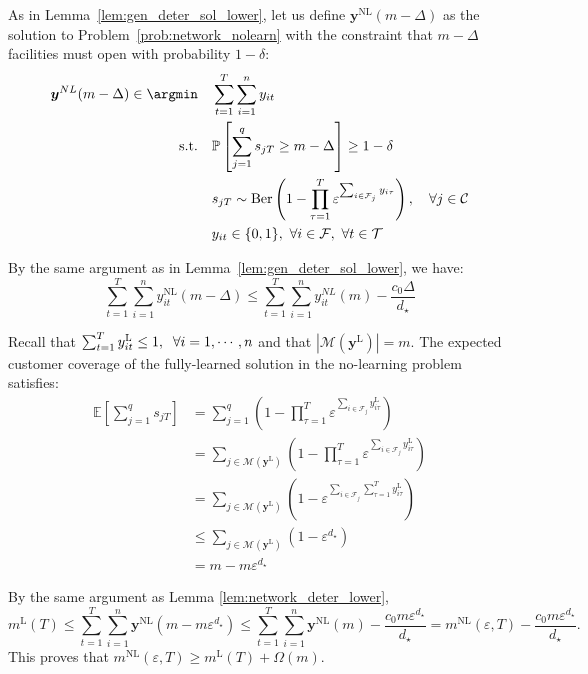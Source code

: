 \documentclass[nonblindrev]{informs3noheader}
\DeclareMathOperator\Ber{Ber}
\def\E{\mathbb{E}}
\def\P{\mathbb{P}}
\def\calC{\mathcal{C}}
\def\calF{\mathcal{F}}
\def\calM{\mathcal{M}}
\def\calT{\mathcal{T}}
\def\by{\boldsymbol{y}}
\def\st{\text{s.t.}}
\begin{document}
As in Lemma~\ref{lem:gen_deter_sol_lower}, let us define $\by^{\mathrm{NL}}(m-\Delta)$ as the solution to Problem~\eqref{prob:network_nolearn} with the constraint that $m-\Delta$ facilities must open with probability $1-\delta$:
\begin{align*}
    \by^{NL}(m-\Delta)\in\argmin \quad & \sum_{t=1}^T \sum_{i=1}^n y_{it} \\
    \st\quad&\P\left[\sum_{j=1}^q s_{jT} \geq m-\Delta\right] \geq 1-\delta\\
    \quad& s_{jT}\sim \Ber\left(1-\prod_{\tau=1}^T \varepsilon^{\sum_{i \in \calF_j} y_{i\tau}}\right),\quad \forall j\in\calC\\
    \quad& y_{it}\in\{0,1\},\ \forall i\in \calF, \ \forall t\in\calT
\end{align*}

By the same argument as in Lemma~\ref{lem:gen_deter_sol_lower}, we have:
\[\sum_{t=1}^T \sum_{i=1}^n y_{it}^{\mathrm{NL}}(m-\Delta) \leq\sum_{t=1}^T \sum_{i=1}^n y_{it}^{NL}(m) - \frac{c_0\Delta}{d_\star} \]

Recall that $\sum_{t=1}^Ty^{\textsc{L}}_{it}\leq 1, \;\;\forall i=1,\cdots,n$ and that $|\calM(\by^{\mathrm{L}})|=m$. The expected customer coverage of the fully-learned solution in the no-learning problem satisfies:
\begin{align*}
    \E\left[\sum_{j=1}^q s_{jT}\right]
    &= \sum_{j=1}^q\left(1-\prod_{\tau=1}^T \varepsilon^{\sum_{i \in \calF_j} y_{i\tau}^{\mathrm{L}}} \right)\\
    &=\sum_{j \in \calM(\by^{\mathrm{L}})} \left(1 - \prod_{\tau=1}^T \varepsilon^{\sum_{i \in \calF_j} y_{i\tau}^{\mathrm{L}}}\right) \\
    &=\sum_{j \in \calM(\by^{\mathrm{L}})} \left(1 - \varepsilon^{\sum_{i \in \calF_j} \sum_{\tau=1}^Ty_{i\tau}^{\mathrm{L}}}\right) \\
    &\leq\sum_{j \in \calM(\by^{\mathrm{L}})} \left(1 - \varepsilon^{d_\star}\right) \\
    &=  m - m \varepsilon^{d_\star}
\end{align*}

By the same argument as Lemma \ref{lem:network_deter_lower},
\[m^{\mathrm{L}}(T) \leq \sum_{t=1}^T \sum_{i=1}^n \by^{\mathrm{NL}}(m-m \varepsilon^{d_\star})\leq \sum_{t=1}^T \sum_{i=1}^n \by^{\mathrm{NL}}(m) - \frac{c_0m \varepsilon^{d_\star}}{d_\star}=m^{\mathrm{NL}}(\varepsilon, T) - \frac{c_0m \varepsilon^{d_\star}}{d_\star}.\]
This proves that $m^{\mathrm{NL}}(\varepsilon, T)\geq m^{\mathrm{L}}(T)+\Omega(m)$.
\hfill\Halmos
\end{document}
